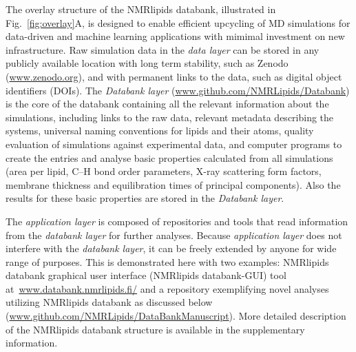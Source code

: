\documentclass[fleqn,10pt]{wlscirep}
\begin{document}
The overlay structure of the NMRlipids databank, illustrated in Fig.~\ref{fig:overlay}A, is designed to enable efficient upcycling of MD simulations for data-driven and machine learning applications with mimimal investment on new infrastructure. Raw simulation data in the {\it data layer} can be stored in any publicly available location with long term stability, such as Zenodo (\url{www.zenodo.org}), and with permanent links to the data, such as digital object identifiers (DOIs). 
The {\it Databank layer} (\url{www.github.com/NMRLipids/Databank}) is the core of the databank containing all the relevant information about the simulations, including links to the raw data, relevant metadata describing the systems, universal naming conventions for lipids and their atoms, quality evaluation of simulations against experimental data, and computer programs to create the entries and analyse basic properties calculated from all simulations (area per lipid, C--H bond order parameters, X-ray scattering form factors, membrane thickness and equilibration times of principal components). Also the results for these basic properties are stored in the {\it Databank layer}. 

The {\it application layer} is composed of repositories and tools that read information from the {\it databank layer} for further analyses. Because {\it application layer} does not interfere with the {\it databank layer}, it can be freely extended by anyone for wide range of purposes. This is demonstrated here with two examples: NMRlipids databank graphical user interface (NMRlipids databank-GUI) tool at~\url{www.databank.nmrlipids.fi/} and a repository exemplifying novel analyses utilizing NMRlipids databank as discussed below (\url{www.github.com/NMRLipids/DataBankManuscript}). More detailed description of the NMRlipids databank structure is available in the supplementary information. 
\end{document}
